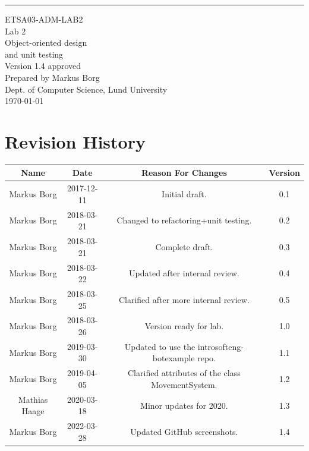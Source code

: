 \documentclass{scrreprt}
\date{}
\def\myversion{1.4 }
\begin{document}
\begin{flushright}
    \rule{16cm}{5pt}\vskip1cm
    \begin{bfseries}
    	\LARGE{ETSA03-ADM-LAB2}\\
    	\vspace{1.5cm}
        \Huge{Lab 2}\\
        \vspace{0.5cm}
        Object-oriented design\\
        \vspace{0.5cm}
        and unit testing\\
        \vspace{1.5cm}
        \LARGE{Version \myversion approved}\\
        \vspace{1.5cm}
        Prepared by Markus Borg\\
        Dept. of Computer Science, Lund University\\
        \vspace{1.5cm}
        \today\\
    \end{bfseries}
\end{flushright}


\chapter*{Revision History}

\begin{center}
    \begin{tabular}{|c|c|c|c|}
        \hline
	    Name & Date & Reason For Changes & Version\\
        \hline
	    Markus Borg & 2017-12-11 & Initial draft. & 0.1\\
        \hline
        Markus Borg & 2018-03-21 & Changed to refactoring+unit testing. & 0.2\\
        \hline
        Markus Borg & 2018-03-21 & Complete draft. & 0.3\\
        \hline
        Markus Borg & 2018-03-22 & Updated after internal review. & 0.4\\
        \hline
        Markus Borg & 2018-03-25 & Clarified after more internal review. & 0.5\\
        \hline
        Markus Borg & 2018-03-26 & Version ready for lab. & 1.0\\
        \hline
        Markus Borg & 2019-03-30 & Updated to use the introsofteng-botexample repo. & 1.1\\
        \hline
        Markus Borg & 2019-04-05 & Clarified attributes of the class MovementSystem. & 1.2\\
        \hline
        Mathias Haage & 2020-03-18 & Minor updates for 2020. & 1.3\\
        \hline
        Markus Borg & 2022-03-28 & Updated GitHub screenshots. & 1.4\\
        \hline
    \end{tabular}
\end{center}
\end{document}
